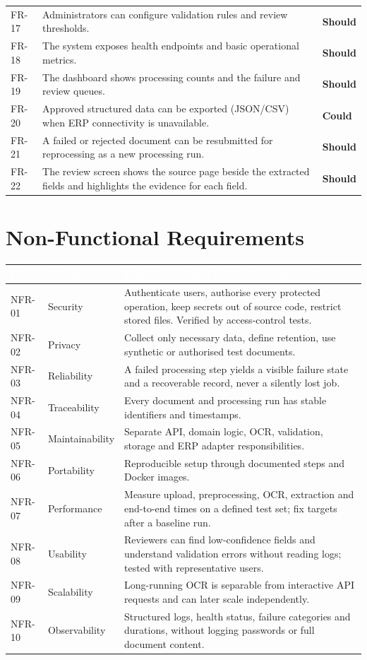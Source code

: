 \documentclass[11pt,a4paper]{report}
\newcommand{\hdr}[1]{\textcolor{white}{\sffamily\bfseries #1}}
\newcommand{\tblstart}{\rowcolors{2}{white}{rowgray}\arrayrulecolor{teal!60}}
\newcommand{\hdrrow}{\rowcolor{navy}}
\newcommand{\should}{\textcolor{amber!85!black}{\sffamily\bfseries Should}}
\newcommand{\could}{\textcolor{tealdark}{\sffamily\bfseries Could}}
\begin{document}
{\begin{longtable}{L{1.4cm}L{11.1cm}L{1.4cm}}
FR-17 & Administrators can configure validation rules and review thresholds. & \should\\
FR-18 & The system exposes health endpoints and basic operational metrics. & \should\\
FR-19 & The dashboard shows processing counts and the failure and review queues. & \should\\
FR-20 & Approved structured data can be exported (JSON/CSV) when ERP connectivity is unavailable. & \could\\
FR-21 & A failed or rejected document can be resubmitted for reprocessing as a new processing run. & \should\\
FR-22 & The review screen shows the source page beside the extracted fields and highlights the evidence for each field. & \should\\
\hline
\end{longtable}}

\section{Non-Functional Requirements}
{\tblstart\small
\begin{longtable}{L{1.7cm}L{2.5cm}L{9.7cm}}
\hdrrow \hdr{ID} & \hdr{Category} & \hdr{Requirement and verification approach}\\ \endhead
NFR-01 & Security & Authenticate users, authorise every protected operation, keep secrets out of source code, restrict stored files. Verified by access-control tests.\\
NFR-02 & Privacy & Collect only necessary data, define retention, use synthetic or authorised test documents.\\
NFR-03 & Reliability & A failed processing step yields a visible failure state and a recoverable record, never a silently lost job.\\
NFR-04 & Traceability & Every document and processing run has stable identifiers and timestamps.\\
NFR-05 & Maintainability & Separate API, domain logic, OCR, validation, storage and ERP adapter responsibilities.\\
NFR-06 & Portability & Reproducible setup through documented steps and Docker images.\\
NFR-07 & Performance & Measure upload, preprocessing, OCR, extraction and end-to-end times on a defined test set; fix targets after a baseline run.\\
NFR-08 & Usability & Reviewers can find low-confidence fields and understand validation errors without reading logs; tested with representative users.\\
NFR-09 & Scalability & Long-running OCR is separable from interactive API requests and can later scale independently.\\
NFR-10 & Observability & Structured logs, health status, failure categories and durations, without logging passwords or full document content.\\
\hline
\end{longtable}}
\end{document}
